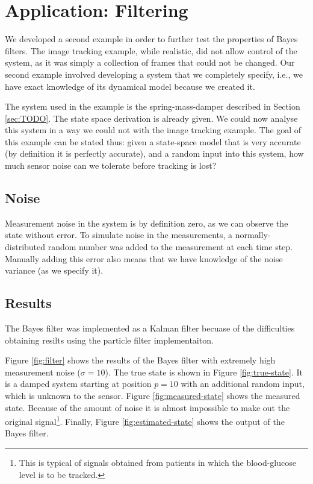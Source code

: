 \section{Application: Filtering}
We developed a second example in order to further test the properties of Bayes
filters. The image tracking example, while realistic, did not allow control of
the system, as it was simply a collection of frames that could not be changed.
Our second example involved developing a system that we completely specify, i.e.,
we have exact knowledge of its dynamical model because we created it.

The system used in the example is the spring-mass-damper described in Section
\ref{sec:TODO}. The state space derivation is already given. We could now
analyse this system in a way we could not with the image tracking example. The
goal of this example can be stated thus: given a state-space model that is
very accurate (by definition it is perfectly accurate), and a random input
into this system, how much sensor noise can we tolerate before tracking is lost?

\subsection{Noise}
Measurement noise in the system is by definition zero, as we can observe the
state without error. To simulate noise in the measurements, a normally-distributed
random number was added to the measurement at each time step. Manually adding this
error also means that we have knowledge of the noise variance (as we specify it).

\subsection{Results}
The Bayes filter was implemented as a Kalman filter becuase of the difficulties
obtaining resilts using the particle filter implementaiton.

Figure \ref{fig:filter} shows the results of the Bayes filter with extremely
high measurement noise ($\sigma = 10$). The true state is shown in Figure
\ref{fig:true-state}. It is a damped system starting at position $p = 10$ with
an additional random input, which is unknown to the sensor. Figure \ref{fig:measured-state}
shows the measured state. Because of the amount of noise it is almost impossible
to make out the original signal\footnote{This is typical of signals obtained
from patients in which the blood-glucose level is to be tracked.}. Finally,
Figure \ref{fig:estimated-state} shows the output of the Bayes filter.

